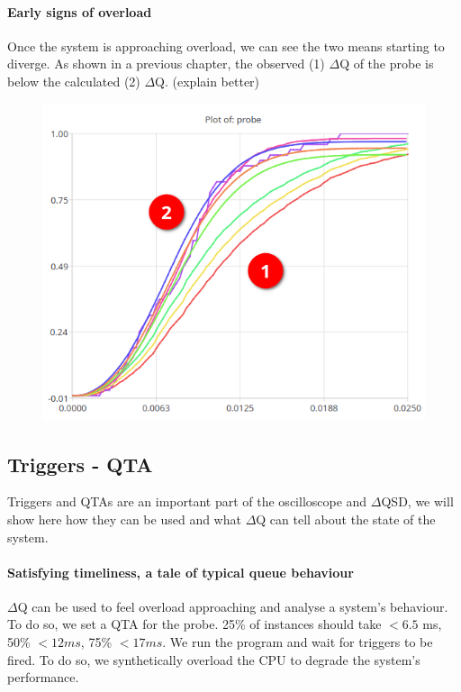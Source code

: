 \paragraph{Early signs of overload}
    
    Once the system is approaching overload, we can see the two means starting to diverge. As shown in a previous chapter, the observed (1) $\Delta$Q of the probe is below the calculated (2) $\Delta$Q. (explain better) 
    \begin{figure}[H]
        \begin{center}
            \includegraphics[scale=0.6]{img/diverging11.png}
        \end{center}
    \end{figure}

    \subsection{Triggers - QTA}
        Triggers and QTAs are an important part of the oscilloscope and $\Delta$QSD, we will show here how they can be used and what $\Delta$Q can tell about the state of the system.

        \paragraph{Satisfying timeliness, a tale of typical queue behaviour}

        $\Delta$Q can be used to feel overload approaching and analyse a system's behaviour. To do so, we set a QTA for the probe. 25\% of instances should take $< 6.5$ ms, 50\% $<12 ms$, 75\% $<17 ms$. We run the program and wait for triggers to be fired. To do so, we synthetically overload the CPU to degrade the system's performance.
         
